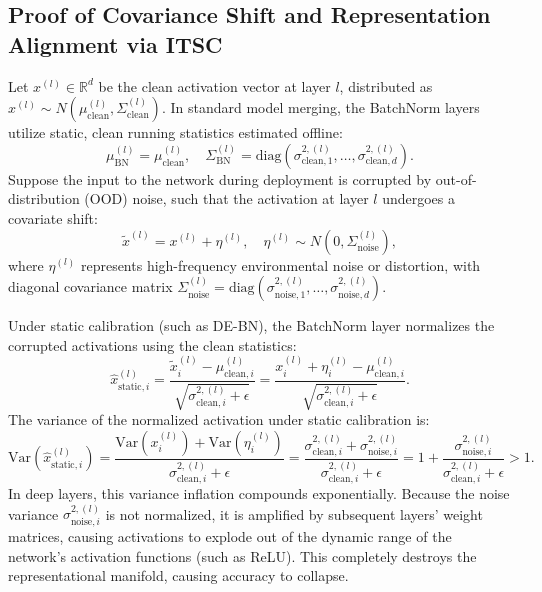 \documentclass{article}
\theoremstyle{plain}
\theoremstyle{definition}
\theoremstyle{remark}
\begin{document}
\subsection{Proof of Covariance Shift and Representation Alignment via ITSC}

Let $x^{(l)} \in \mathbb{R}^d$ be the clean activation vector at layer $l$, distributed as $x^{(l)} \sim N(\mu_{\text{clean}}^{(l)}, \Sigma_{\text{clean}}^{(l)})$. In standard model merging, the BatchNorm layers utilize static, clean running statistics estimated offline:
\begin{equation}
    \mu_{\text{BN}}^{(l)} = \mu_{\text{clean}}^{(l)}, \quad \Sigma_{\text{BN}}^{(l)} = \text{diag}(\sigma_{\text{clean}, 1}^{2,(l)}, \dots, \sigma_{\text{clean}, d}^{2,(l)}).
\end{equation}
Suppose the input to the network during deployment is corrupted by out-of-distribution (OOD) noise, such that the activation at layer $l$ undergoes a covariate shift:
\begin{equation}
    \tilde{x}^{(l)} = x^{(l)} + \eta^{(l)}, \quad \eta^{(l)} \sim N(0, \Sigma_{\text{noise}}^{(l)}),
\end{equation}
where $\eta^{(l)}$ represents high-frequency environmental noise or distortion, with diagonal covariance matrix $\Sigma_{\text{noise}}^{(l)} = \text{diag}(\sigma_{\text{noise}, 1}^{2,(l)}, \dots, \sigma_{\text{noise}, d}^{2,(l)})$.

Under static calibration (such as DE-BN), the BatchNorm layer normalizes the corrupted activations using the clean statistics:
\begin{equation}
    \hat{x}_{\text{static}, i}^{(l)} = \frac{\tilde{x}_i^{(l)} - \mu_{\text{clean}, i}^{(l)}}{\sqrt{\sigma_{\text{clean}, i}^{2,(l)} + \epsilon}} = \frac{x_i^{(l)} + \eta_i^{(l)} - \mu_{\text{clean}, i}^{(l)}}{\sqrt{\sigma_{\text{clean}, i}^{2,(l)} + \epsilon}}.
\end{equation}
The variance of the normalized activation under static calibration is:
\begin{equation}
    \text{Var}\left(\hat{x}_{\text{static}, i}^{(l)}\right) = \frac{\text{Var}\left(x_i^{(l)}\right) + \text{Var}\left(\eta_i^{(l)}\right)}{\sigma_{\text{clean}, i}^{2,(l)} + \epsilon} = \frac{\sigma_{\text{clean}, i}^{2,(l)} + \sigma_{\text{noise}, i}^{2,(l)}}{\sigma_{\text{clean}, i}^{2,(l)} + \epsilon} = 1 + \frac{\sigma_{\text{noise}, i}^{2,(l)}}{\sigma_{\text{clean}, i}^{2,(l)} + \epsilon} > 1.
\end{equation}
In deep layers, this variance inflation compounds exponentially. Because the noise variance $\sigma_{\text{noise}, i}^{2,(l)}$ is not normalized, it is amplified by subsequent layers' weight matrices, causing activations to explode out of the dynamic range of the network's activation functions (such as ReLU). This completely destroys the representational manifold, causing accuracy to collapse.
\end{document}
